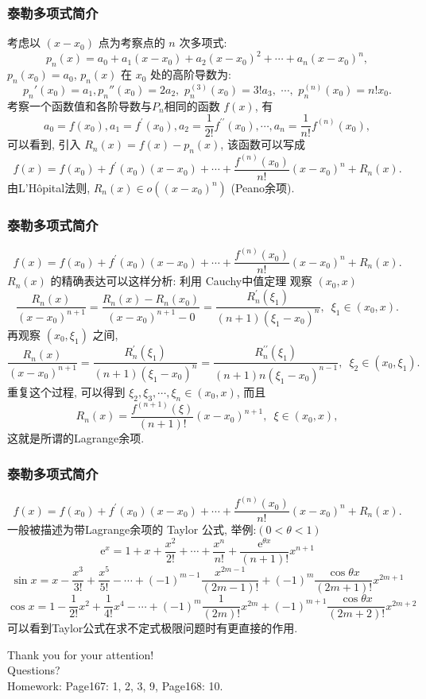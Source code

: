 \documentclass[
10pt,
aspectratio=43,
]{beamer}
\begin{document}
\begin{frame}
	\frametitle{泰勒多项式简介}
	考虑以 $(x-x_0)$ 点为考察点的 $n$ 次多项式:
	$$
		p_n(x)=a_0+a_1\left(x-x_0\right)+a_2\left(x-x_0\right)^2+\cdots+a_n\left(x-x_0\right)^n,
	$$
	\pause
	$p_n(x_0)=a_0$, $p_n(x)$ 在 $x_0$ 处的高阶导数为:
	$$
		p_n'(x_0)=a_1,p_n''(x_0)=2a_2,\,\,p_n^{(3)}(x_0)=3!a_3,\,\,\cdots,\,\,p_n^{(n)}(x_0)=n!x_0.
	$$
	\pause
	考察一个函数值和各阶导数与$P_n$相同的函数 $f(x)$, 有
	$$
		a_0=f\left(x_0\right), a_1=f^{\prime}\left(x_0\right), a_2=\frac{1}{2 !} f^{\prime \prime}\left(x_0\right), \cdots, a_n=\frac{1}{n !} f^{(n)}\left(x_0\right),
	$$
	\pause
	可以看到, 引入 $R_n(x)=f(x)-p_n(x)$, 该函数可以写成
	$$
		f(x)=f\left(x_0\right)+f^{\prime}\left(x_0\right)\left(x-x_0\right)+\cdots+\frac{f^{(n)}\left(x_0\right)}{n !}\left(x-x_0\right)^n+R_n(x).
	$$
	由L'Hôpital法则, $R_n(x)\in o((x-x_0)^n)$ (Peano余项).
\end{frame}


\begin{frame}
	\frametitle{泰勒多项式简介}
	\pause
	$$
		f(x)=f\left(x_0\right)+f^{\prime}\left(x_0\right)\left(x-x_0\right)+\cdots+\frac{f^{(n)}\left(x_0\right)}{n !}\left(x-x_0\right)^n+R_n(x).
	$$
	\pause
	$R_n(x)$ 的精确表达可以这样分析: 利用 Cauchy中值定理 观察 $(x_0,x)$
	$$
		\frac{R_n(x)}{\left(x-x_0\right)^{n+1}}=\frac{R_n(x)-R_n\left(x_0\right)}{\left(x-x_0\right)^{n+1}-0}=\frac{R_n^{\prime}\left(\xi_1\right)}{(n+1)\left(\xi_1-x_0\right)^n},\,\,\,\xi_1\in(x_0,x).
	$$
	\pause
	再观察 $(x_0,\xi_1)$ 之间,
	$$
		\frac{R_n(x)}{\left(x-x_0\right)^{n+1}}=\frac{R_n^{\prime}\left(\xi_1\right)}{(n+1)\left(\xi_1-x_0\right)^n}=\frac{R_n^{\prime\prime}\left(\xi_1\right)}{(n+1)n\left(\xi_1-x_0\right)^{n-1}},\,\,\,\xi_2\in(x_0,\xi_1).
	$$
	\pause
	重复这个过程, 可以得到 $\xi_2,\xi_3,\cdots,\xi_n\in(x_0,x)$, 而且
	$$
		R_n(x)=\frac{f^{(n+1)}(\xi)}{(n+1) !}\left(x-x_0\right)^{n+1},\,\,\,\xi\in(x_0,x),
	$$
	这就是所谓的Lagrange余项.
\end{frame}

\begin{frame}
	\frametitle{泰勒多项式简介}

	$$
		f(x)=f\left(x_0\right)+f^{\prime}\left(x_0\right)\left(x-x_0\right)+\cdots+\frac{f^{(n)}\left(x_0\right)}{n !}\left(x-x_0\right)^n+R_n(x).
	$$
	\pause
	一般被描述为带Lagrange余项的 Taylor 公式, 举例:$(0<\theta<1)$
	$$
		\mathrm{e}^x=1+x+\frac{x^2}{2 !}+\cdots+\frac{x^n}{n !}+\frac{\mathrm{e}^{\theta x}}{(n+1) !} x^{n+1}
	$$
	\pause
	$$
		\sin x=x-\frac{x^3}{3 !}+\frac{x^5}{5 !}-\cdots+(-1)^{m-1} \frac{x^{2 m-1}}{(2 m-1) !}+(-1)^m \frac{\cos \theta x}{(2 m+1) !} x^{2 m+1}
	$$
	\pause
	$$
		\cos x=1-\frac{1}{2 !} x^2+\frac{1}{4 !} x^4-\cdots+(-1)^m \frac{1}{(2 m) !} x^{2 m}+(-1)^{m+1} \frac{\cos \theta x}{(2 m+2) !} x^{2 m+2}
	$$
	\pause
	可以看到Taylor公式在求不定式极限问题时有更直接的作用.
\end{frame}

\begin{frame}[plain]
	\vfill
	\centering
	{
	\centering \Huge \color{white} Thank you for your attention!\\[10pt]Questions?\\ [10pt] Homework: Page167: 1, 2, 3, 9, Page168: 10.
	}
	\vfill
\end{frame}
\end{document}

